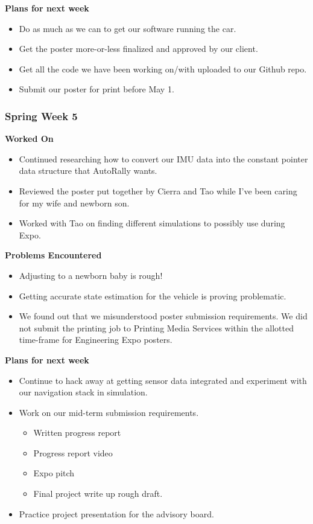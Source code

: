\documentclass[compsoc,draftclsnofoot,onecolumn,10pt]{IEEEtran}
\begin{document}
\textbf{Plans for next week}
\begin{itemize}
    \item Do as much as we can to get our software running the car.
    \item Get the poster more-or-less finalized and approved by our client.
    \item Get all the code we have been working on/with uploaded to our Github repo.
    \item Submit our poster for print before May 1.
\end{itemize}


\subsubsection*{Spring Week 5}
\textbf{Worked On}
\begin{itemize}
    \item Continued researching how to convert our IMU data into the constant pointer data structure that AutoRally wants.
    \item Reviewed the poster put together by Cierra and Tao while I've been caring for my wife and newborn son.
    \item Worked with Tao on finding different simulations to possibly use during Expo.
\end{itemize}

\textbf{Problems Encountered}
\begin{itemize}
    \item Adjusting to a newborn baby is rough!
    \item Getting accurate state estimation for the vehicle is proving problematic.
    \item We found out that we misunderstood poster submission requirements. We did not submit the printing job to Printing Media Services within the allotted time-frame for Engineering Expo posters.
\end{itemize}

\textbf{Plans for next week}
\begin{itemize}
    \item Continue to hack away at getting sensor data integrated and experiment with our navigation stack in simulation.
    \item Work on our mid-term submission requirements.
    \begin{itemize}
        \item Written progress report
        \item Progress report video
        \item Expo pitch
        \item Final project write up rough draft.
    \end{itemize}
    \item Practice project presentation for the advisory board.
\end{itemize}
\end{document}
